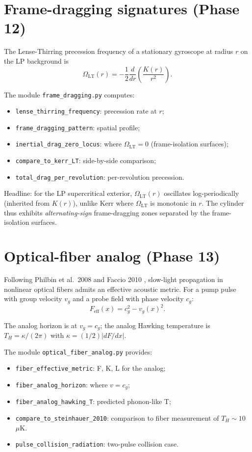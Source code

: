 \documentclass[11pt,a4paper]{article}
\begin{document}
\section{Frame-dragging signatures (Phase 12)}

The Lense-Thirring precession frequency of a stationary gyroscope at
radius $r$ on the LP background is
\[
\Omega_\text{LT}(r) = -\frac{1}{2} \frac{d}{dr}\!\left(\frac{K(r)}{r^2}\right).
\]

The module \texttt{frame\_dragging.py} computes:
\begin{itemize}
\item \texttt{lense\_thirring\_frequency}: precession rate at $r$;
\item \texttt{frame\_dragging\_pattern}: spatial profile;
\item \texttt{inertial\_drag\_zero\_locus}: where $\Omega_\text{LT} = 0$
  (frame-isolation surfaces);
\item \texttt{compare\_to\_kerr\_LT}: side-by-side comparison;
\item \texttt{total\_drag\_per\_revolution}: per-revolution precession.
\end{itemize}

Headline: for the LP supercritical exterior, $\Omega_\text{LT}(r)$
oscillates log-periodically (inherited from $K(r)$), unlike Kerr
where $\Omega_\text{LT}$ is monotonic in $r$. The cylinder thus
exhibits \emph{alternating-sign} frame-dragging zones separated by
the frame-isolation surfaces.

\section{Optical-fiber analog (Phase 13)}

Following Philbin et al.\ 2008 \cite{Philbin2008} and Faccio 2010
\cite{Faccio2010}, slow-light propagation in nonlinear optical
fibers admits an effective acoustic metric. For a pump pulse with
group velocity $v_g$ and a probe field with phase velocity $c_g$:
\[
F_\text{eff}(x) = c_g^2 - v_g(x)^2.
\]

The analog horizon is at $v_g = c_g$; the analog Hawking temperature
is $T_H = \kappa / (2\pi)$ with $\kappa = (1/2)|dF/dx|$.

The module \texttt{optical\_fiber\_analog.py} provides:
\begin{itemize}
\item \texttt{fiber\_effective\_metric}: F, K, L for the analog;
\item \texttt{fiber\_analog\_horizon}: where $v = c_g$;
\item \texttt{fiber\_analog\_hawking\_T}: predicted phonon-like T;
\item \texttt{compare\_to\_steinhauer\_2010}: comparison to fiber
  measurement of $T_H \sim 10$ $\mu$K.
\item \texttt{pulse\_collision\_radiation}: two-pulse collision case.
\end{itemize}
\end{document}
